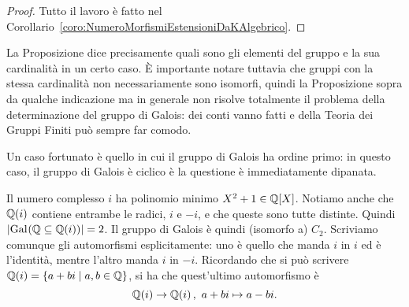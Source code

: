 \begin{proof}
Tutto il lavoro è fatto nel Corollario~\ref{coro:NumeroMorfismiEstensioniDaKAlgebrico}. 
\end{proof}

La Proposizione dice precisamente quali sono gli elementi del gruppo e la sua cardinalità in un certo caso. È importante notare tuttavia che gruppi con la stessa cardinalità non necessariamente sono isomorfi, quindi la Proposizione sopra da qualche indicazione ma in generale non risolve totalmente il problema della determinazione del gruppo di Galois: dei conti vanno fatti e della Teoria dei Gruppi Finiti può sempre far comodo.

Un caso fortunato è quello in cui il gruppo di Galois ha ordine primo: in questo caso, il gruppo di Galois è ciclico è la questione è immediatamente dipanata.

\begin{esem}
Il numero complesso \(i\) ha polinomio minimo \(X^2+1 \in \mathbb{Q}[X]\). Notiamo anche che \(\mathbb{Q}(i)\) contiene entrambe le radici, \(i\) e \(-i\), e che queste sono tutte distinte. Quindi \(\left\lvert\operatorname{Gal}_{}\!\left(\mathbb{Q} \subseteq \mathbb{Q}(i)\right)\right\rvert = 2\). Il gruppo di Galois è quindi (isomorfo a) \(C_2\). Scriviamo comunque gli automorfismi esplicitamente: uno è quello che manda \(i\) in \(i\) ed è l'identità, mentre l'altro manda \(i\) in \(-i\). Ricordando che si può scrivere \(\mathbb{Q}(i) = \{a+bi \mid a, b \in \mathbb{Q}\}\), si ha che quest'ultimo automorfismo è
\[\mathbb{Q}(i) \to \mathbb{Q}(i)\,,\ a+bi \mapsto a-bi .\]
\end{esem}

